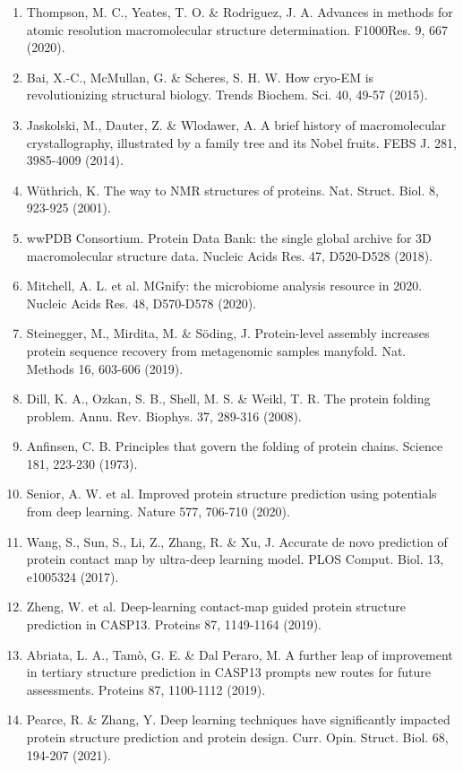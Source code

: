 \documentclass[10pt]{article}
\begin{document}
\begin{enumerate}
  \item Thompson, M. C., Yeates, T. O. \& Rodriguez, J. A. Advances in methods for atomic resolution macromolecular structure determination. F1000Res. 9, 667 (2020).
  \item Bai, X.-C., McMullan, G. \& Scheres, S. H. W. How cryo-EM is revolutionizing structural biology. Trends Biochem. Sci. 40, 49-57 (2015).
  \item Jaskolski, M., Dauter, Z. \& Wlodawer, A. A brief history of macromolecular crystallography, illustrated by a family tree and its Nobel fruits. FEBS J. 281, 3985-4009 (2014).
  \item Wüthrich, K. The way to NMR structures of proteins. Nat. Struct. Biol. 8, 923-925 (2001).
  \item wwPDB Consortium. Protein Data Bank: the single global archive for 3D macromolecular structure data. Nucleic Acids Res. 47, D520-D528 (2018).
  \item Mitchell, A. L. et al. MGnify: the microbiome analysis resource in 2020. Nucleic Acids Res. 48, D570-D578 (2020).
  \item Steinegger, M., Mirdita, M. \& Söding, J. Protein-level assembly increases protein sequence recovery from metagenomic samples manyfold. Nat. Methods 16, 603-606 (2019).
  \item Dill, K. A., Ozkan, S. B., Shell, M. S. \& Weikl, T. R. The protein folding problem. Annu. Rev. Biophys. 37, 289-316 (2008).
  \item Anfinsen, C. B. Principles that govern the folding of protein chains. Science 181, 223-230 (1973).
  \item Senior, A. W. et al. Improved protein structure prediction using potentials from deep learning. Nature 577, 706-710 (2020).
  \item Wang, S., Sun, S., Li, Z., Zhang, R. \& Xu, J. Accurate de novo prediction of protein contact map by ultra-deep learning model. PLOS Comput. Biol. 13, e1005324 (2017).
  \item Zheng, W. et al. Deep-learning contact-map guided protein structure prediction in CASP13. Proteins 87, 1149-1164 (2019).
  \item Abriata, L. A., Tamò, G. E. \& Dal Peraro, M. A further leap of improvement in tertiary structure prediction in CASP13 prompts new routes for future assessments. Proteins 87, 1100-1112 (2019).
  \item Pearce, R. \& Zhang, Y. Deep learning techniques have significantly impacted protein structure prediction and protein design. Curr. Opin. Struct. Biol. 68, 194-207 (2021).

\end{enumerate}
\end{document}
